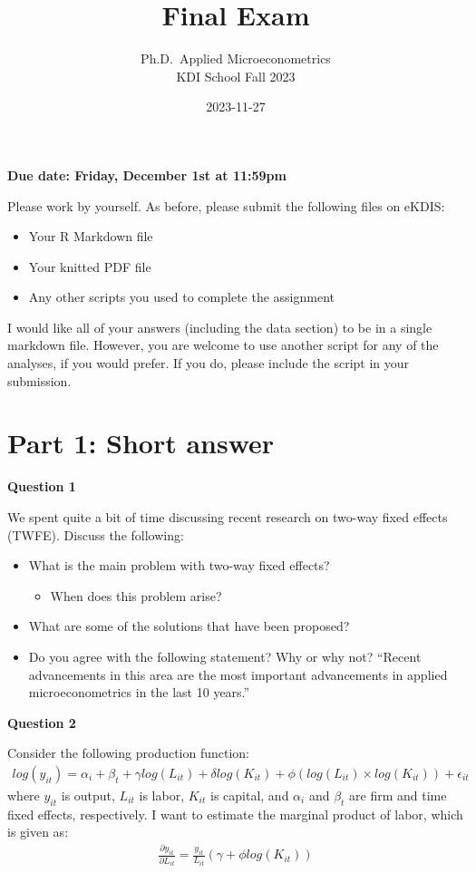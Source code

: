 \documentclass[
]{article}
\title{Final Exam}
\subtitle{Ph.D.~Applied Microeconometrics\\
KDI School Fall 2023}
\author{}
\date{\vspace{-2.5em}2023-11-27}
\providecommand{\tightlist}{%
  \setlength{\itemsep}{0pt}\setlength{\parskip}{0pt}}
\begin{document}
\maketitle

\textbf{Due date: Friday, December 1st at 11:59pm}

Please work by yourself. As before, please submit the following files on eKDIS:

\begin{itemize}
\tightlist
\item
  Your R Markdown file
\item
  Your knitted PDF file
\item
  Any other scripts you used to complete the assignment
\end{itemize}

I would like all of your answers (including the data section) to be in a single markdown file. However, you are welcome to use another script for any of the analyses, if you would prefer. If you do, please include the script in your submission.

\hypertarget{part-1-short-answer}{%
\section{Part 1: Short answer}\label{part-1-short-answer}}

\textbf{Question 1}

We spent quite a bit of time discussing recent research on two-way fixed effects (TWFE). Discuss the following:

\begin{itemize}
\tightlist
\item
  What is the main problem with two-way fixed effects?

  \begin{itemize}
  \tightlist
  \item
    When does this problem arise?
  \end{itemize}
\item
  What are some of the solutions that have been proposed?
\item
  Do you agree with the following statement? Why or why not? ``Recent advancements in this area are the most important advancements in applied microeconometrics in the last 10 years.''
\end{itemize}

\textbf{Question 2}

Consider the following production function:
\begin{gather} \label{eq:prod} log(y_{it}) = \alpha_i + \beta_t + \gamma log(L_{it}) + \delta log(K_{it}) + \phi\left(log(L_{it})\times log(K_{it})\right) + \epsilon_{it} \end{gather}
where \(y_{it}\) is output, \(L_{it}\) is labor, \(K_{it}\) is capital, and \(\alpha_i\) and \(\beta_t\) are firm and time fixed effects, respectively. I want to estimate the marginal product of labor, which is given as:
\begin{gather} \label{eq:mp} \frac{\partial y_{it}}{\partial L_{it}} = \frac{y_{it}}{L_{it}}\left(\gamma + \phi log(K_{it})\right) \end{gather}
\end{document}

